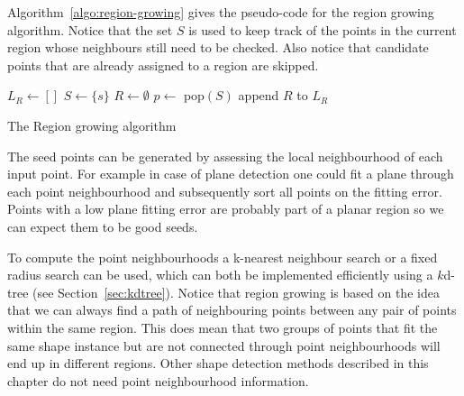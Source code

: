 Algorithm~\ref{algo:region-growing} gives the pseudo-code for the region growing algorithm.
Notice that the set $S$ is used to keep track of the points in the current region whose neighbours still need to be checked.
Also notice that candidate points that are already assigned to a region are skipped.
\begin{algorithm}
	
	$L_R \leftarrow [\xspace]$\;
	 {
		$S \leftarrow \{s\}$\;
		$R \leftarrow \emptyset$\;
		{
			$p \leftarrow $ pop$(S)$\;
			{
				 {
				}
			}
		}
		append $R$ to $L_R$\;
	}
	\caption{The Region growing algorithm}%
\label{algo:region-growing}
\end{algorithm}

The seed points can be generated by assessing the local neighbourhood of each input point. 
For example in case of plane detection one could fit a plane through each point neighbourhood and subsequently sort all points on the fitting error. 
Points with a low plane fitting error are probably part of a planar region so we can expect them to be good seeds.

To compute the point neighbourhoods a k-nearest neighbour search or a fixed radius search can be used, which can both be implemented efficiently using a $k$d-tree (see Section~\ref{sec:kdtree}).
Notice that region growing is based on the idea that we can always find a path of neighbouring points between any pair of points within the same region.
This does mean that two groups of points that fit the same shape instance but are not connected through point neighbourhoods will end up in different regions.
Other shape detection methods described in this chapter do not need point neighbourhood information.

